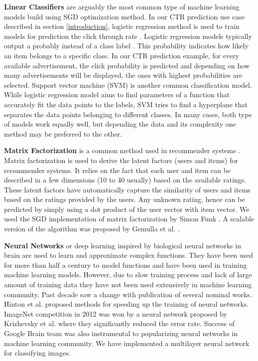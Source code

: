 \documentclass{vldb}
\begin{document}
\textbf{Linear Classifiers} are arguably the most common type of machine learning models build using SGD optimization method. 
In our CTR prediction use case described in section \ref{introduction}, logistic regression method is used to train models for prediction the click through rate \cite{macmahan2013}. 
Logistic regression models typically output a probably instead of a class label \cite{hosmer2013applied}. 
This probability indicates how likely an item belongs to a specific class.
In our CTR prediction example, for every available advertisement, the click probability is predicted and depending on how many advertisements will be displayed, the ones with highest probabilities are selected.
Support vector machine (SVM) \cite{steinwart2008support} is another common classification model.
While logistic regression model aims to find parameters of a function that accurately fit the data points to the labels, SVM tries to find a hyperplane that separates the data points belonging to different classes.
In many cases, both type of models work equally well, but depending the data and its complexity one method may be preferred to the other.

\textbf{Matrix Factorization} is a common method used in recommender systems \cite{koren2009matrix}. 
Matrix factorization is used to derive the latent factors (users and items) for recommender systems.
It relies on the fact that each user and item can be described in a few dimensions (10 to 40 usually) based on the available ratings.
These latent factors have automatically capture the similarity of users and items based on the ratings provided by the users.
Any unknown rating, hence can be predicted by simply using a dot product of the user vector with item vector.
We used the SGD implementation of matrix factorization by Simon Funk \cite{funk2006netflix}. 
A scalable version of the algorithm was proposed by Gemulla et al. \cite{gemulla2011large}.

\textbf{Neural Networks} or deep learning inspired by biological neural networks in brain are used to learn and approximate complex functions. 
They have been used for more than half a century to model functions and have been used in training machine learning models.
However, due to slow training process and lack of large amount of training data they have not been used extensively in machine learning community.
Past decade saw a change with publication of several nominal works.
Hinton et al. \cite{hinton2006fast} proposed methods for speeding up the training of neural networks.
ImageNet competition \cite{ILSVRC15} in 2012 was won by a neural network proposed by Krizhevsky et al. \cite{krizhevsky2012imagenet} where they significantly reduced the error rate. 
Success of Google Brain team \cite{sutskever2014sequence, mikolov2013efficient} was also instrumental to popularizing neural networks in machine learning community.
We have implemented a multilayer neural network for classifying images.
\end{document}
